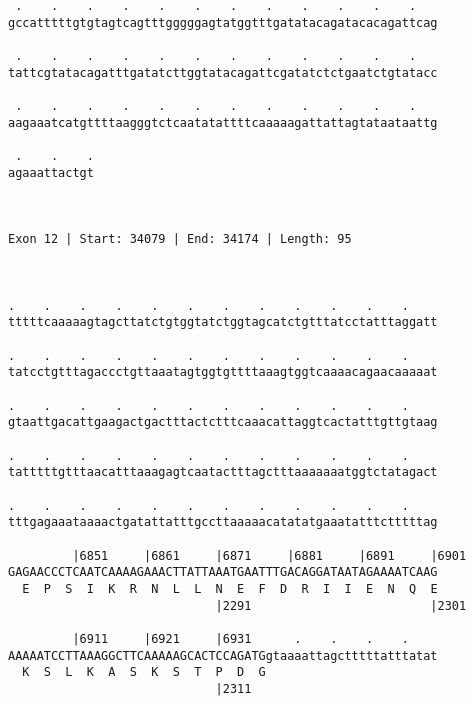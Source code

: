 \documentclass{article}
\begin{document}
\begin{Verbatim}
 .    .    .    .    .    .    .    .    .    .    .    .   
gccatttttgtgtagtcagtttgggggagtatggtttgatatacagatacacagattcag
                                                            
 .    .    .    .    .    .    .    .    .    .    .    .   
tattcgtatacagatttgatatcttggtatacagattcgatatctctgaatctgtatacc
                                                            
 .    .    .    .    .    .    .    .    .    .    .    .   
aagaaatcatgttttaagggtctcaatatattttcaaaaagattattagtataataattg
                                                            
 .    .    .
agaaattactgt
            
            
 
Exon 12 | Start: 34079 | End: 34174 | Length: 95



.    .    .    .    .    .    .    .    .    .    .    .    
tttttcaaaaagtagcttatctgtggtatctggtagcatctgtttatcctatttaggatt
                                                            
.    .    .    .    .    .    .    .    .    .    .    .    
tatcctgtttagaccctgttaaatagtggtgttttaaagtggtcaaaacagaacaaaaat
                                                            
.    .    .    .    .    .    .    .    .    .    .    .    
gtaattgacattgaagactgactttactctttcaaacattaggtcactatttgttgtaag
                                                            
.    .    .    .    .    .    .    .    .    .    .    .    
tatttttgtttaacatttaaagagtcaatactttagctttaaaaaaatggtctatagact
                                                            
.    .    .    .    .    .    .    .    .    .    .    .    
tttgagaaataaaactgatattatttgccttaaaaacatatatgaaatatttctttttag
                                                            
         |6851     |6861     |6871     |6881     |6891     |6901
GAGAACCCTCAATCAAAAGAAACTTATTAAATGAATTTGACAGGATAATAGAAAATCAAG
  E  P  S  I  K  R  N  L  L  N  E  F  D  R  I  I  E  N  Q  E
                             |2291                         |2301
  
         |6911     |6921     |6931      .    .    .    .    
AAAAATCCTTAAAGGCTTCAAAAAGCACTCCAGATGgtaaaattagctttttatttatat
  K  S  L  K  A  S  K  S  T  P  D  G                        
                             |2311                          
  

\end{Verbatim}
\end{document}
